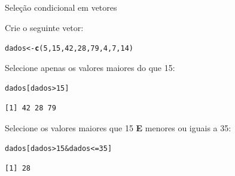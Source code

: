 \documentclass[10pt,handout]{beamer}\usepackage[]{graphicx}\usepackage[]{color}
\makeatletter
\newcommand{\hlnum}[1]{\textcolor[rgb]{0.686,0.059,0.569}{#1}}%
\newcommand{\hlopt}[1]{\textcolor[rgb]{0,0,0}{#1}}%
\newcommand{\hlstd}[1]{\textcolor[rgb]{0.345,0.345,0.345}{#1}}%
\newcommand{\hlkwb}[1]{\textcolor[rgb]{0.69,0.353,0.396}{#1}}%
\newcommand{\hlkwd}[1]{\textcolor[rgb]{0.282,0.239,0.545}{\textbf{#1}}}%
\newenvironment{kframe}{%
 \def\at@end@of@kframe{}%
 \ifinner\ifhmode%
  \def\at@end@of@kframe{\end{minipage}}%
  \begin{minipage}{\columnwidth}%
 \fi\fi%
 \def\FrameCommand##1{\hskip\@totalleftmargin \hskip-\fboxsep
 \colorbox{shadecolor}{##1}\hskip-\fboxsep
     \hskip-\linewidth \hskip-\@totalleftmargin \hskip\columnwidth}%
 \MakeFramed {\advance\hsize-\width
   \@totalleftmargin\z@ \linewidth\hsize
   \@setminipage}}%
 {\par\unskip\endMakeFramed%
 \at@end@of@kframe}
\newenvironment{knitrout}{}{} %
\makeatother
\begin{document}
\begin{frame}[fragile]{Seleção condicional em vetores}
\begin{center}
\end{center}
Crie o seguinte vetor:
\begin{knitrout}\small
{}\color{fgcolor}\begin{kframe}
\begin{alltt}
\hlstd{dados} \hlkwb{<-} \hlkwd{c}\hlstd{(}\hlnum{5}\hlstd{,} \hlnum{15}\hlstd{,} \hlnum{42}\hlstd{,} \hlnum{28}\hlstd{,} \hlnum{79}\hlstd{,} \hlnum{4}\hlstd{,} \hlnum{7}\hlstd{,} \hlnum{14}\hlstd{)}
\end{alltt}
\end{kframe}
\end{knitrout}

Selecione apenas os valores maiores do que 15:
\begin{knitrout}\small
{}\color{fgcolor}\begin{kframe}
\begin{alltt}
\hlstd{dados[dados} \hlopt{>} \hlnum{15}\hlstd{]}
\end{alltt}
\begin{verbatim}
[1] 42 28 79
\end{verbatim}
\end{kframe}
\end{knitrout}

Selecione os valores maiores que 15 \textbf{E} menores ou iguais a 35:
\begin{knitrout}\small
{}\color{fgcolor}\begin{kframe}
\begin{alltt}
\hlstd{dados[dados} \hlopt{>} \hlnum{15} \hlopt{&} \hlstd{dados} \hlopt{<=} \hlnum{35}\hlstd{]}
\end{alltt}
\begin{verbatim}
[1] 28
\end{verbatim}
\end{kframe}
\end{knitrout}

\end{frame}
\end{document}
